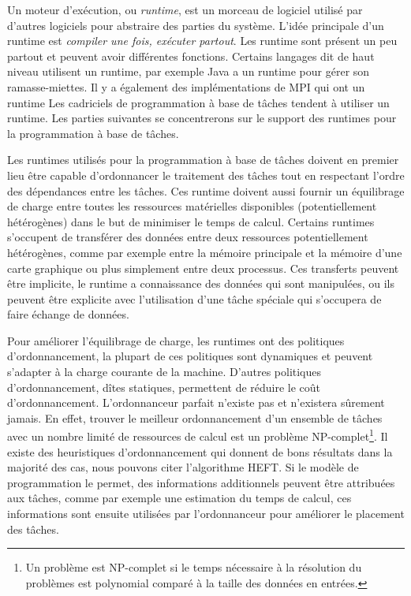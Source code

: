 Un moteur d'exécution, ou {\em runtime}, est un morceau de logiciel utilisé par d'autres logiciels pour abstraire des parties du système.
%
L'idée principale d'un runtime est {\em compiler une fois, exécuter partout}.
%
Les runtime sont présent un peu partout et peuvent avoir différentes fonctions.
%
Certains langages dit de haut niveau utilisent un runtime, par exemple Java a un runtime pour gérer son ramasse-miettes.
%
Il y a également des implémentations de MPI qui ont un runtime
%
Les cadriciels de programmation à base de tâches tendent à utiliser un runtime.
%
Les parties suivantes se concentrerons sur le support des runtimes pour la programmation à base de tâches.


Les runtimes utilisés pour la programmation à base de tâches doivent en premier lieu être capable d'ordonnancer le traitement des tâches tout en respectant l'ordre des dépendances entre les tâches.
%
Ces runtime doivent aussi fournir un équilibrage de charge entre toutes les ressources matérielles disponibles (potentiellement hétérogènes) dans le but de minimiser le temps de calcul.
%
Certains runtimes s'occupent de transférer des données entre deux ressources potentiellement hétérogènes, comme par exemple entre la mémoire principale et la mémoire d'une carte graphique ou plus simplement entre deux processus.
%
Ces transferts peuvent être implicite, le runtime a connaissance des données qui sont manipulées, ou ils peuvent être explicite avec l'utilisation d'une tâche spéciale qui s'occupera de faire échange de données.


Pour améliorer l'équilibrage de charge, les runtimes ont des politiques d'ordonnancement, la plupart de ces politiques sont dynamiques et peuvent s'adapter à la charge courante de la machine.
%
D'autres politiques d'ordonnancement, dîtes statiques, permettent de réduire le coût d'ordonnancement.
%
L'ordonnanceur parfait n'existe pas et n'existera sûrement jamais.
%
En effet, trouver le meilleur ordonnancement d'un ensemble de tâches avec un nombre limité de ressources de calcul est un problème NP-complet\footnote{Un problème est NP-complet si le temps nécessaire à la résolution du problèmes est polynomial comparé à la taille des données en entrées.}.
%
Il existe des heuristiques d'ordonnancement qui donnent de bons résultats dans la majorité des cas, nous pouvons citer l'algorithme HEFT\cite{heft}.
%
Si le modèle de programmation le permet, des informations additionnels peuvent être attribuées aux tâches, comme par exemple une estimation du temps de calcul, ces informations sont ensuite utilisées par l'ordonnanceur pour améliorer le placement des tâches.


